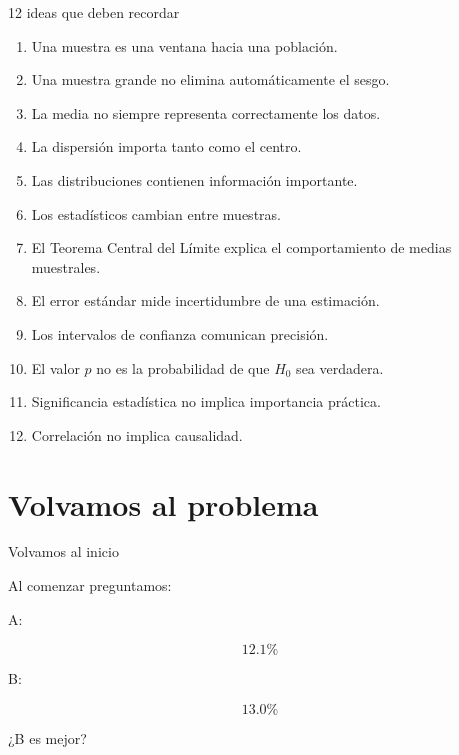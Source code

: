 \documentclass[aspectratio=169,11pt]{beamer}
\begin{document}
\begin{frame}{12 ideas que deben recordar}

\scriptsize

\begin{enumerate}

    \item Una muestra es una ventana hacia una población.

    \item Una muestra grande no elimina automáticamente el sesgo.

    \item La media no siempre representa correctamente los datos.

    \item La dispersión importa tanto como el centro.

    \item Las distribuciones contienen información importante.

    \item Los estadísticos cambian entre muestras.

    \item El Teorema Central del Límite explica el comportamiento de medias muestrales.

    \item El error estándar mide incertidumbre de una estimación.

    \item Los intervalos de confianza comunican precisión.

    \item El valor $p$ no es la probabilidad de que $H_0$ sea verdadera.

    \item Significancia estadística no implica importancia práctica.

    \item Correlación no implica causalidad.

\end{enumerate}

\end{frame}

\section{Volvamos al problema}

\begin{frame}{Volvamos al inicio}

Al comenzar preguntamos:

\begin{center}

A:

\[
12.1\%
\]

B:

\[
13.0\%
\]

\vspace{0.4cm}

{\Huge
¿B es mejor?
}

\end{center}

\end{frame}
\end{document}
